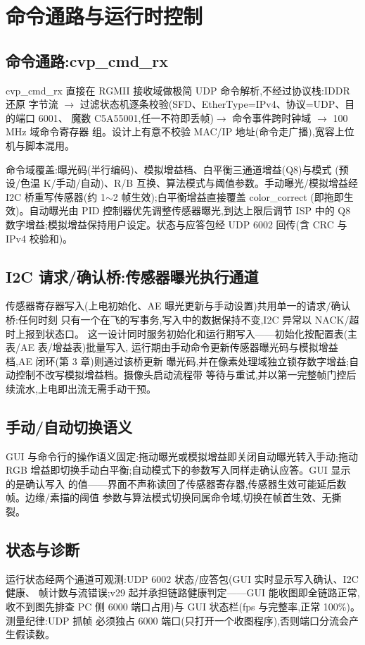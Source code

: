 \chapter{命令通路与运行时控制}

\section{命令通路:cvp\_cmd\_rx}

cvp\_cmd\_rx 直接在 RGMII 接收域做极简 UDP 命令解析,不经过协议栈:IDDR 还原
字节流 $\to$ 过滤状态机逐条校验(SFD、EtherType=IPv4、协议=UDP、目的端口 6001、
魔数 C5A55001,任一不符即丢帧)$\to$ 命令事件跨时钟域 $\to$ 100\,MHz 域命令寄存器
组。设计上有意不校验 MAC/IP 地址(命令走广播),宽容上位机与脚本混用。

命令域覆盖:曝光码(半行编码)、模拟增益档、白平衡三通道增益(Q8)与模式
(预设/色温 K/手动/自动)、R/B 互换、算法模式与阈值参数。手动曝光/模拟增益经
I2C 桥重写传感器(约 1$\sim$2 帧生效);白平衡增益直接覆盖 color\_correct
(即拖即生效)。自动曝光由 PID 控制器优先调整传感器曝光,到达上限后调节 ISP
中的 Q8 数字增益;模拟增益保持用户设定。状态与应答包经 UDP 6002
回传(含 CRC 与 IPv4 校验和)。

\section{I2C 请求/确认桥:传感器曝光执行通道}

传感器寄存器写入(上电初始化、AE 曝光更新与手动设置)共用单一的请求/确认桥:任何时刻
只有一个在飞的写事务,写入中的数据保持不变,I2C 异常以 NACK/超时上报到状态口。
这一设计同时服务初始化和运行期写入——初始化按配置表(主表/AE 表/增益表)批量写入,
运行期由手动命令更新传感器曝光码与模拟增益档,AE 闭环(第 3 章)则通过该桥更新
曝光码,并在像素处理域独立锁存数字增益;自动控制不改写模拟增益档。摄像头启动流程带
等待与重试,并以第一完整帧门控后续流水,上电即出流无需手动干预。

\section{手动/自动切换语义}

GUI 与命令行的操作语义固定:拖动曝光或模拟增益即关闭自动曝光转入手动;拖动 RGB
增益即切换手动白平衡;自动模式下的参数写入同样走确认应答。GUI 显示的是确认写入
的值——界面不声称读回了传感器寄存器,传感器生效可能延后数帧。边缘/素描的阈值
参数与算法模式切换同属命令域,切换在帧首生效、无撕裂。

\section{状态与诊断}

运行状态经两个通道可观测:UDP 6002 状态/应答包(GUI 实时显示写入确认、I2C 健康、
帧计数与流错误;v29 起并承担链路健康判定——GUI 能收图即全链路正常,收不到图先排查
PC 侧 6000 端口占用)与 GUI 状态栏(fps 与完整率,正常 100\%)。测量纪律:UDP 抓帧
必须独占 6000 端口(只打开一个收图程序),否则端口分流会产生假读数。
